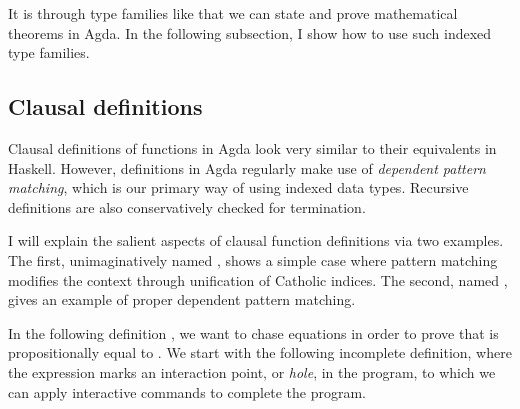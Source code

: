 
It is through type families like \AgdaDatatype{\_$\equiv$\_} that we can state
and prove mathematical theorems in Agda.
In the following subsection, I show how to use such indexed type families.

\subsection{Clausal definitions}

Clausal definitions of functions in Agda look very similar to their equivalents
in Haskell.
However, definitions in Agda regularly make use of
\emph{dependent pattern matching}, which is our primary way of using indexed
data types.
Recursive definitions are also conservatively checked for termination.

I will explain the salient aspects of clausal function definitions via two
examples.
The first, unimaginatively named , shows a simple case where
pattern matching modifies the context through unification of Catholic indices.
The second, named , gives an example of proper
dependent pattern matching.

In the following definition , we want to chase equations in
order to prove that  is propositionally equal to .
We start with the following incomplete definition, where the expression
 marks an interaction point, or \emph{hole}, in the program, to
which we can apply interactive commands to complete the program.

\begin{code}
\>[0]\AgdaSpace{}%
\AgdaSymbol{:}\AgdaSpace{}%
\AgdaSpace{}%
\AgdaSymbol{\{}\AgdaSpace{}%
\AgdaSymbol{:}\AgdaSpace{}%
\AgdaSymbol{\}}\AgdaSpace{}%
\AgdaSymbol{\{}\AgdaSpace{}%
\AgdaSpace{}%
\AgdaSpace{}%
\AgdaSymbol{:}\AgdaSpace{}%
\AgdaSymbol{\}}\AgdaSpace{}%
\AgdaSpace{}%
\AgdaSpace{}%
\AgdaSpace{}%
\AgdaSpace{}%
\AgdaSpace{}%
\AgdaSpace{}%
\AgdaSpace{}%
\AgdaSpace{}%
\AgdaSpace{}%
\AgdaSpace{}%
\AgdaSpace{}%
\<%
\\
\>[0]\AgdaSpace{}%
\AgdaSpace{}%
\AgdaSpace{}%
\AgdaSymbol{=}\AgdaSpace{}%
\<%
\end{code}

